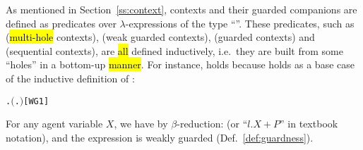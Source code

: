 As mentioned in
Section~\ref{ss:context}, \univariate contexts and their
guarded companions are defined as predicates over $\lambda$-expressions
of the type ``''. These predicates, such as
(\hl{multi-hole} contexts),  (weak guarded contexts),
 (guarded contexts) and  (sequential
contexts), are \hl{all} defined inductively, i.e.~they are built from some ``holes''
in a bottom-up \hl{manner}. For instance, 
holds because 
holds as a base case of the inductive definition of :
\begin{alltt}
\HOLTokenTurnstile{} \HOLSymConst{\HOLTokenForall{}}.  \ensuremath{(}\HOLTokenLambda{}. \HOLSymConst{\ensuremath{\ldotp}}\ensuremath{)}\hfill{[WG1]}
\end{alltt}
For any agent variable $X$, we have by $\beta$-reduction:
 (or ``$l.X + P$'' in textbook
notation), and the expression is weakly guarded (Def.~\ref{def:guardness}).

